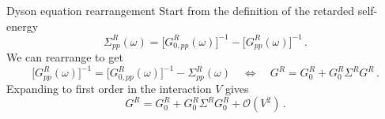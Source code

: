 \documentclass[aspectratio=169]{beamer}
\begin{document}
\begin{frame}{Dyson equation rearrangement}
\small
Start from the definition of the retarded self-energy
\begin{equation}
  \Sigma^R_{pp}(\omega) 
  = \bigl[G_{0,pp}^R(\omega)\bigr]^{-1} 
  - \bigl[G_{pp}^R(\omega)\bigr]^{-1} \,.
\end{equation}
We can rearrange to get
\begin{equation}
  \bigl[G_{pp}^R(\omega)\bigr]^{-1}
  = \bigl[G_{0,pp}^R(\omega)\bigr]^{-1} - \Sigma^R_{pp}(\omega)
  \quad\Longleftrightarrow\quad
  G^R = G_0^R + G_0^R \Sigma^R G^R \,.
\end{equation}
Expanding to first order in the interaction $V$ gives
\begin{equation}
  G^R = G_0^R + G_0^R \Sigma^R G_0^R + \mathcal{O}(V^2)\,.
\end{equation}
\end{frame}
\end{document}
